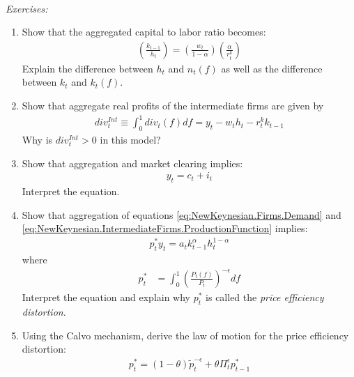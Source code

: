 ~\\\noindent\emph{Exercises:}
\begin{enumerate}[resume]

\item Show that the aggregated capital to labor ratio becomes:
\begin{align}
\left(\frac{k_{t-1}}{h_t}\right) = \left(\frac{w_t}{1-\alpha}\right) \left(\frac{\alpha}{r^k_t}\right) \label{eq:NewKeynesian.IntermediateFirms.CapitalLaborRatioAggregated}
\end{align}
Explain the difference between $h_t$ and $n_t(f)$ as well as the difference between $k_t$ and $k_t(f)$.

\item Show that aggregate real profits of the intermediate firms are given by
\begin{align}
div^{Int}_t \equiv \int_{0}^{1} div_t(f) df = y_t - w_t h_t - r^k_t k_{t-1}\label{eq:NewKeynesian.IntermediateFirms.AggregateProfits}
\end{align}
Why is $div^{Int}_t>0$ in this model?

\item Show that aggregation and market clearing implies:
\begin{align}
y_t = c_t + i_t \label{eq:NewKeynesian.AggregateDemand}
\end{align}
Interpret the equation.

\item Show that aggregation of equations \eqref{eq:NewKeynesian.Firms.Demand} and \eqref{eq:NewKeynesian.IntermediateFirms.ProductionFunction} implies:
\begin{align}
p_t^* y_t = a_t k_{t-1}^\alpha h_t^{1-\alpha} \label{eq:NewKeynesian.AggregateSupply}
\end{align}
where
\begin{align}
p_t^* &= \int_{0}^1 \left(\frac{P_t(f)}{P_t}\right)^{-\epsilon} df \label{eq:NewKeynesian.PriceDistortionDefinition}
\end{align}
Interpret the equation and explain why $p_t^*$ is called the \emph{price efficiency distortion}.

\item Using the Calvo mechanism, derive the law of motion for the price efficiency distortion:
\begin{align}
p_{t}^*=\left(1-\theta\right) \widetilde{p}_t^{-\epsilon}+\theta \Pi_{t}^{\epsilon} p_{t-1}^* \label{eq:NewKeynesian.PriceDistortionLoM}
\end{align}

\end{enumerate}

